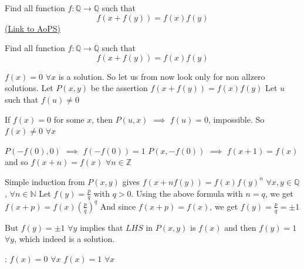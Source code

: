 \begin{problem}
	Find all function $f: \mathbb{Q} \to \mathbb{Q}$ such that
\[f(x+f(y))=f(x)f(y)\]
	\flushright \href{https://artofproblemsolving.com/community/c6h488077}{(Link to AoPS)}
\end{problem}






\begin{solution}
	\begin{tcolorbox}Find all function $f: \mathbb{Q} \to \mathbb{Q}$ such that
\[f(x+f(y))=f(x)f(y)\]\end{tcolorbox}
$f(x)=0$ $\forall x$ is a solution. So let us from now look only for non allzero solutions.
Let $P(x,y)$ be the assertion $f(x+f(y))=f(x)f(y)$
Let $u$ such that $f(u)\ne 0$

If $f(x)=0$ for some $x$, then $P(u,x)$ $\implies$ $f(u)=0$, impossible. So $f(x)\ne 0$ $\forall x$

$P(-f(0),0)$ $\implies$ $f(-f(0))=1$
$P(x,-f(0))$ $\implies$ $f(x+1)=f(x)$ and so $f(x+n)=f(x)$ $\forall n\in\mathbb Z$

Simple induction from $P(x,y)$ gives $f(x+nf(y))=f(x)f(y)^n$ $\forall x,y\in\mathbb Q$, $\forall n\in\mathbb N$
Let $f(y)=\frac pq$ with $q>0$. Using the above formula with $n=q$, we get $f(x+p)=f(x)\left(\frac pq\right)^q$
And since $f(x+p)=f(x)$, we get $f(y)=\frac pq=\pm 1$

But $f(y)=\pm 1$ $\forall y$ implies that $LHS$ in $P(x,y)$ is $f(x)$ and then $f(y)=1$ $\forall y$, which indeed is a solution.

 :
$f(x)=0$ $\forall x$
$f(x)=1$ $\forall x$
\end{solution}




